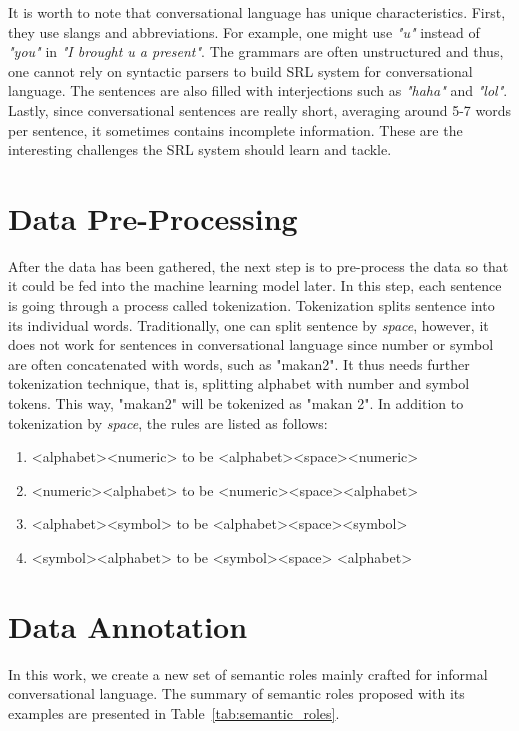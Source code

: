 It is worth to note that conversational language has unique characteristics. First, they use slangs and abbreviations. For example, one might use \textit{"u"} instead of \textit{"you"} in \textit{"I brought u a present"}. The grammars are often unstructured and thus, one cannot rely on syntactic parsers to build SRL system for conversational language. The sentences are also filled with interjections such as \textit{"haha"} and \textit{"lol"}. Lastly, since conversational sentences are really short, averaging around 5-7 words per sentence, it sometimes contains incomplete information. These are the interesting challenges the SRL system should learn and tackle.

\section{Data Pre-Processing}
After the data has been gathered, the next step is to pre-process the data so that it could be fed into the machine learning model later. In this step, each sentence is going through a process called tokenization. Tokenization splits sentence into its individual words. Traditionally, one can split sentence by \textit{space}, however, it does not work for sentences in conversational language since number or symbol are often concatenated with words, such as "makan2". It thus needs further tokenization technique, that is, splitting alphabet with number and symbol tokens. This way, "makan2" will be tokenized as "makan 2". In addition to tokenization by \textit{space}, the rules are listed as follows:

\begin{enumerate}
	\item <alphabet><numeric> to be <alphabet><space><numeric>
	\item <numeric><alphabet> to be <numeric><space><alphabet>
	\item <alphabet><symbol> to be <alphabet><space><symbol>
	\item <symbol><alphabet> to be <symbol><space> <alphabet>
\end{enumerate}

\section{Data Annotation}
In this work, we create a new set of semantic roles mainly crafted for informal conversational language. The summary of semantic roles proposed with its examples are presented in Table~\ref{tab:semantic_roles}.

